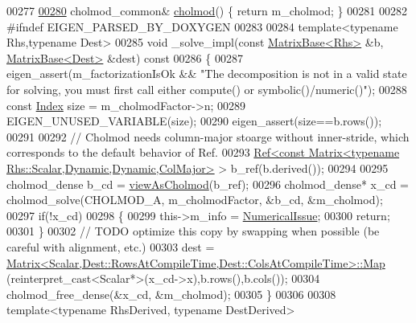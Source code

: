 \begin{DoxyCode}
00277     
\hyperlink{class_eigen_1_1_cholmod_base_a6a85bf52d6aa480240a64f277d7f96c6}{00280}     cholmod\_common& \hyperlink{class_eigen_1_1_cholmod_base_a6a85bf52d6aa480240a64f277d7f96c6}{cholmod}() \{ \textcolor{keywordflow}{return} m\_cholmod; \}
00281     
00282 \textcolor{preprocessor}{    #ifndef EIGEN\_PARSED\_BY\_DOXYGEN}
00283 
00284     \textcolor{keyword}{template}<\textcolor{keyword}{typename} Rhs,\textcolor{keyword}{typename} Dest>
00285     \textcolor{keywordtype}{void} \_solve\_impl(\textcolor{keyword}{const} \hyperlink{group___core___module_class_eigen_1_1_matrix_base}{MatrixBase<Rhs>} &b, \hyperlink{group___core___module_class_eigen_1_1_matrix_base}{MatrixBase<Dest>} &dest)\textcolor{keyword}{ const}
00286 \textcolor{keyword}{    }\{
00287       eigen\_assert(m\_factorizationIsOk && \textcolor{stringliteral}{"The decomposition is not in a valid state for solving, you must
       first call either compute() or symbolic()/numeric()"});
00288       \textcolor{keyword}{const} \hyperlink{namespace_eigen_a62e77e0933482dafde8fe197d9a2cfde}{Index} size = m\_cholmodFactor->n;
00289       EIGEN\_UNUSED\_VARIABLE(size);
00290       eigen\_assert(size==b.rows());
00291       
00292       \textcolor{comment}{// Cholmod needs column-major stoarge without inner-stride, which corresponds to the default behavior
       of Ref.}
00293       \hyperlink{group___core___module_class_eigen_1_1_ref}{Ref<const Matrix<typename Rhs::Scalar,Dynamic,Dynamic,ColMajor>}
       > b\_ref(b.derived());
00294 
00295       cholmod\_dense b\_cd = \hyperlink{namespace_eigen_ac9fb9e40cfc9ddbdc7da84ee01bb7545}{viewAsCholmod}(b\_ref);
00296       cholmod\_dense* x\_cd = cholmod\_solve(CHOLMOD\_A, m\_cholmodFactor, &b\_cd, &m\_cholmod);
00297       \textcolor{keywordflow}{if}(!x\_cd)
00298       \{
00299         this->m\_info = \hyperlink{group__enums_gga85fad7b87587764e5cf6b513a9e0ee5eaaf9b736d310a664e7729d163a035cc5f}{NumericalIssue};
00300         \textcolor{keywordflow}{return};
00301       \}
00302       \textcolor{comment}{// TODO optimize this copy by swapping when possible (be careful with alignment, etc.)}
00303       dest = \hyperlink{group___core___module_class_eigen_1_1_matrix}{Matrix<Scalar,Dest::RowsAtCompileTime,Dest::ColsAtCompileTime>::Map}
      (reinterpret\_cast<Scalar*>(x\_cd->x),b.rows(),b.cols());
00304       cholmod\_free\_dense(&x\_cd, &m\_cholmod);
00305     \}
00306     
00308     \textcolor{keyword}{template}<\textcolor{keyword}{typename} RhsDerived, \textcolor{keyword}{typename} DestDerived>

\end{DoxyCode}
